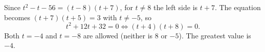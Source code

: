 Since $t^2-t-56=(t-8)(t+7)$, for $t\ne8$ the left side is $t+7$. The equation becomes $(t+7)(t+5)=3$ with $t\ne-5$, so
\[
t^2+12t+32=0\iff(t+4)(t+8)=0 .
\]
Both $t=-4$ and $t=-8$ are allowed (neither is $8$ or $-5$). The greatest value is $\boxed{-4}$.
